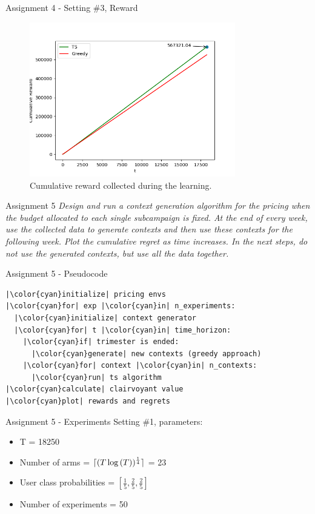 \documentclass[11pt]{beamer}
\DeclarePairedDelimiter{\ceil}{\lceil}{\rceil}
\begin{document}
\begin{frame}{Assignment 4 - Setting \#3, Reward}
\begin{figure}[hbtp]
\centering
\includegraphics[width=0.8\textwidth]{images/assignment_4_exp_3_cum_reward.png}
\caption{Cumulative reward collected during the learning.}
\end{figure}
\end{frame}

\begin{frame}{Assignment 5}
\textit{Design and run a context generation algorithm for the pricing when the budget allocated to each single subcampaign is fixed. At the end of every week, use the collected data to generate contexts and then use these contexts for the following week. Plot the cumulative regret as time increases. In the next steps, do not use the generated contexts, but use all the data together.}
\end{frame}

\begin{frame}[fragile]{Assignment 5 - Pseudocode}
\begin{lstlisting}
|\color{cyan}initialize| pricing envs
|\color{cyan}for| exp |\color{cyan}in| n_experiments:
  |\color{cyan}initialize| context generator 
  |\color{cyan}for| t |\color{cyan}in| time_horizon:
    |\color{cyan}if| trimester is ended:
      |\color{cyan}generate| new contexts (greedy approach)
    |\color{cyan}for| context |\color{cyan}in| n_contexts:
      |\color{cyan}run| ts algorithm
|\color{cyan}calculate| clairvoyant value
|\color{cyan}plot| rewards and regrets
\end{lstlisting}
\end{frame}

\begin{frame}{Assignment 5 - Experiments}
Setting \#1, parameters:
\begin{itemize}
\item T = 18250
\item Number of arms = $\ceil{(T \log{(T)})^{\frac{1}{4}}}$ = 23
\item User class probabilities = $[\frac{1}{5}, \frac{2}{5}, \frac{2}{5}]$
\item Number of experiments = 50
\end{itemize}
\end{frame}
\end{document}
